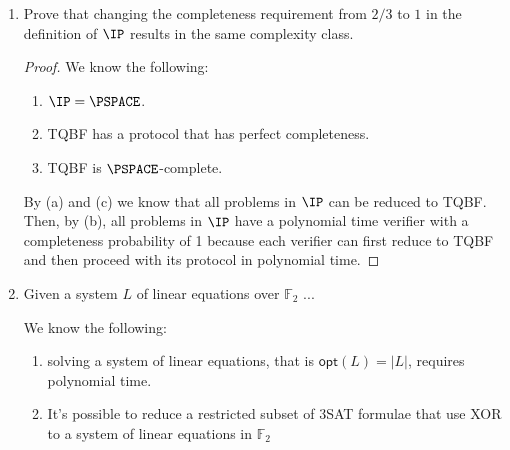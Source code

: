 \documentclass[usletter]{article}
\begin{document}
\begin{enumerate}
   \item Prove that changing the completeness requirement from $2/3$ to $1$ in the definition of $\IP$ results in the same complexity class.

     \begin{proof}
      We know the following:

      \begin{enumerate}
        \item $\IP = \PSPACE$.
        \item TQBF has a protocol that has perfect completeness.
        \item TQBF is $\PSPACE$-complete.
      \end{enumerate}

      By (a) and (c) we know that all problems in $\IP$ can be reduced to TQBF. Then, by (b), all problems in $\IP$ have a polynomial time verifier with a completeness probability of 1 because each verifier can first reduce to TQBF and then proceed with its protocol in polynomial time.
    \end{proof}

    \item Given a system $L$ of linear equations over $\mathbb{F}_2$ ...

      We know the following:

      \begin{enumerate}
        \item solving a system of linear equations, that is $\mathsf{opt}(L) = |L|$, requires polynomial time.
        \item It's possible to reduce a restricted subset of 3SAT formulae that use XOR to a system of linear equations in $\mathbb{F}_2$
      \end{enumerate}

\end{enumerate}


\newpage



\end{document}
